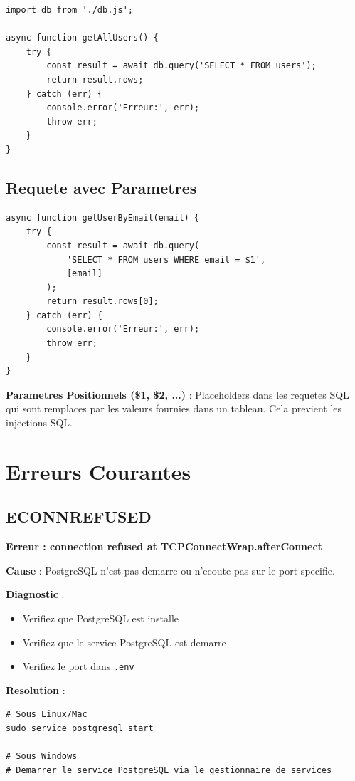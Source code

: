 \documentclass[a4paper,12pt]{book}
\begin{document}
\begin{lstlisting}[style=javascript, caption=Execution d'une requete simple]
import db from './db.js';

async function getAllUsers() {
    try {
        const result = await db.query('SELECT * FROM users');
        return result.rows;
    } catch (err) {
        console.error('Erreur:', err);
        throw err;
    }
}
\end{lstlisting}

\subsection{Requete avec Parametres}

\begin{lstlisting}[style=javascript, caption=Requete avec parametres (recommande)]
async function getUserByEmail(email) {
    try {
        const result = await db.query(
            'SELECT * FROM users WHERE email = $1',
            [email]
        );
        return result.rows[0];
    } catch (err) {
        console.error('Erreur:', err);
        throw err;
    }
}
\end{lstlisting}

\begin{definitionbox}
    \textbf{Parametres Positionnels (\$1, \$2, ...)} : Placeholders dans les requetes SQL qui sont remplaces par les valeurs fournies dans un tableau. Cela previent les injections SQL.
\end{definitionbox}

\section{Erreurs Courantes}

\subsection{ECONNREFUSED}

\begin{errorbox}
    \textbf{Erreur : connection refused at TCPConnectWrap.afterConnect}

    \textbf{Cause} : PostgreSQL n'est pas demarre ou n'ecoute pas sur le port specifie.

    \textbf{Diagnostic} :
    \begin{itemize}
        \item Verifiez que PostgreSQL est installe
        \item Verifiez que le service PostgreSQL est demarre
        \item Verifiez le port dans \texttt{.env}
    \end{itemize}

    \textbf{Resolution} :
    \begin{lstlisting}[style=bash]
# Sous Linux/Mac
sudo service postgresql start

# Sous Windows
# Demarrer le service PostgreSQL via le gestionnaire de services
    \end{lstlisting}
\end{errorbox}
\end{document}
